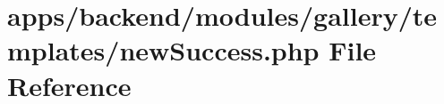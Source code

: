 \hypertarget{backend_2modules_2gallery_2templates_2new_success_8php}{\section{apps/backend/modules/gallery/templates/new\-Success.php File Reference}
\label{backend_2modules_2gallery_2templates_2new_success_8php}
}
